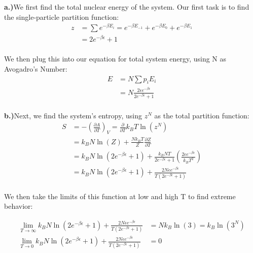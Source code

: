 \documentclass[10pt]{article} %
\begin{document}
\textbf{a.)}We first find the total nuclear energy of the system.
Our first task is to find the single-particle partition function:\\

\begin{align*}
  z &= \sum e^{-\beta E_i} = e^{-\beta E_{-1}} + e^{-\beta E_0} + e^{-\beta E_1}\\
  &= 2e^{-\beta\epsilon}+1\\
\end{align*}

We then plug this into our equation for total system energy, using N as Avogadro's
Number:\\

\begin{align*}
  E &= N\sum p_iE_i\\
  &= N\frac{2\epsilon e^{-\beta\epsilon}}{2e^{-\beta\epsilon} + 1}\\
\end{align*}

\textbf{b.)}Next, we find the system's entropy, using $z^N$ as the total partition
function:\\

\begin{align*}
  S &= -\left(\frac{\partial A}{\partial T}\right)_V =
  \frac{\partial}{\partial T} k_BT\ln(z^N)\\
  &= k_BN\ln(Z) + \frac{Nk_BT}{Z}\frac{\partial Z}{\partial T}\\
  &= k_BN\ln\left(2e^{-\beta\epsilon}+1\right)
  + \frac{k_BNT}{2e^{-\beta\epsilon}+1}
  \left(\frac{2\epsilon e^{-\beta\epsilon}}{k_BT^2}\right)\\
  &= k_BN\ln\left(2e^{-\beta\epsilon}+1\right)
  + \frac{2N\epsilon e^{-\beta\epsilon}}{T\left(2e^{-\beta\epsilon}+1\right)}\\
\end{align*}

We then take the limits of this function at low and high T to find extreme
behavior:

\begin{align*}
  \lim_{T\rightarrow\infty} k_BN\ln\left(2e^{-\beta\epsilon}+1\right)
  + \frac{2N\epsilon e^{-\beta\epsilon}}{T\left(2e^{-\beta\epsilon}+1\right)}
  &= Nk_B\ln\left(3\right) = k_B\ln\left(3^N\right)\\
  \lim_{T\rightarrow0} k_BN\ln\left(2e^{-\beta\epsilon}+1\right)
  + \frac{2N\epsilon e^{-\beta\epsilon}}{T\left(2e^{-\beta\epsilon}+1\right)}
  &= 0\\
\end{align*}
\end{document}
